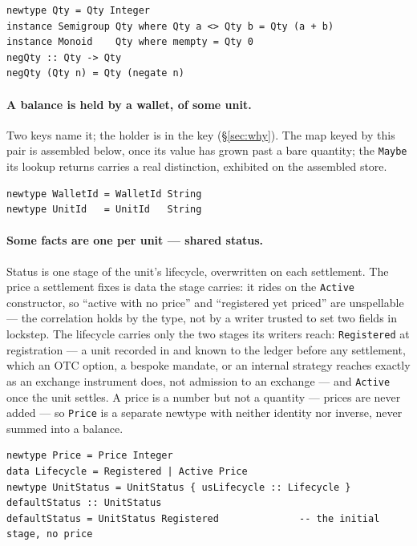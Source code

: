 \documentclass[11pt,a4paper]{article}
\begin{document}
\begin{lstlisting}
newtype Qty = Qty Integer
instance Semigroup Qty where Qty a <> Qty b = Qty (a + b)
instance Monoid    Qty where mempty = Qty 0
negQty :: Qty -> Qty
negQty (Qty n) = Qty (negate n)
\end{lstlisting}

\paragraph{A balance is held by a wallet, of some unit.}
Two keys name it; the holder is in the key (\S\ref{sec:why}). The map keyed by this
pair is assembled below, once its value has
grown past a bare quantity; the \texttt{Maybe} its lookup returns carries a real
distinction, exhibited on the assembled store.

\begin{lstlisting}
newtype WalletId = WalletId String
newtype UnitId   = UnitId   String
\end{lstlisting}

\paragraph{Some facts are one per unit --- shared status.}
Status is one stage of the unit's lifecycle, overwritten
on each settlement. The price a settlement fixes is data the stage carries: it rides
on the \texttt{Active} constructor, so ``active with no price'' and ``registered yet
priced'' are unspellable --- the correlation holds by the type, not by a writer
trusted to set two fields in lockstep. The lifecycle carries only the two stages its
writers reach: \texttt{Registered} at registration --- a unit recorded in and known to
the ledger before any settlement, which an OTC option, a bespoke mandate, or an internal
strategy reaches exactly as an exchange instrument does, not admission to an exchange ---
and \texttt{Active} once the unit
settles. A price is a number but not a quantity --- prices are never added --- so
\texttt{Price} is a separate newtype with neither identity nor inverse, never summed
into a balance.

\begin{lstlisting}
newtype Price = Price Integer
data Lifecycle = Registered | Active Price
newtype UnitStatus = UnitStatus { usLifecycle :: Lifecycle }
defaultStatus :: UnitStatus
defaultStatus = UnitStatus Registered              -- the initial stage, no price
\end{lstlisting}
\end{document}
